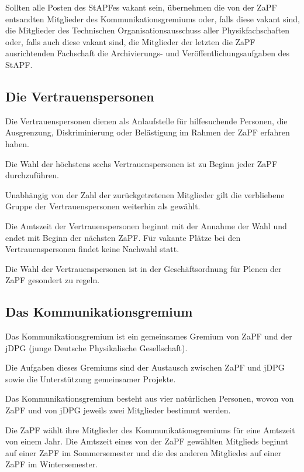 \documentclass[
  a4paper,
  oneside]{scrartcl}
\begin{document}
Sollten alle Posten des StAPFes vakant sein, übernehmen die von der ZaPF
entsandten Mitglieder des Kommunikationsgremiums oder, falls diese
vakant sind, die Mitglieder des Technischen Organisationsausschuss aller
Physikfachschaften oder, falls auch diese vakant sind, die Mitglieder
der letzten die ZaPF ausrichtenden Fachschaft die Archivierungs- und
Veröffentlichungsaufgaben des StAPF.

\hypertarget{die-vertrauenspersonen}{%
\subsection{Die Vertrauenspersonen}\label{die-vertrauenspersonen}}

Die Vertrauenspersonen dienen als Anlaufstelle für hilfesuchende
Personen, die Ausgrenzung, Diskriminierung oder Belästigung im Rahmen
der ZaPF erfahren haben.

Die Wahl der höchstens sechs Vertrauenspersonen ist zu Beginn jeder ZaPF
durchzuführen.

Unabhängig von der Zahl der zurückgetretenen Mitglieder gilt die
verbliebene Gruppe der Vertrauenspersonen weiterhin als gewählt.

Die Amtszeit der Vertrauenspersonen beginnt mit der Annahme der Wahl und
endet mit Beginn der nächsten ZaPF. Für vakante Plätze bei den
Vertrauenspersonen findet keine Nachwahl statt.

Die Wahl der Vertrauenspersonen ist in der Geschäftsordnung für Plenen
der ZaPF gesondert zu regeln.

\hypertarget{das-kommunikationsgremium}{%
\subsection{Das Kommunikationsgremium}\label{das-kommunikationsgremium}}

Das Kommunikationsgremium ist ein gemeinsames Gremium von ZaPF und der
jDPG (junge Deutsche Physikalische Gesellschaft).

Die Aufgaben dieses Gremiums sind der Austausch zwischen ZaPF und jDPG
sowie die Unterstützung gemeinsamer Projekte.

Das Kommunikationsgremium besteht aus vier natürlichen Personen, wovon
von ZaPF und von jDPG jeweils zwei Mitglieder bestimmt werden.

Die ZaPF wählt ihre Mitglieder des Kommunikationsgremiums für eine
Amtszeit von einem Jahr. Die Amtszeit eines von der ZaPF gewählten
Mitglieds beginnt auf einer ZaPF im Sommersemester und die des anderen
Mitgliedes auf einer ZaPF im Wintersemester.
\end{document}
